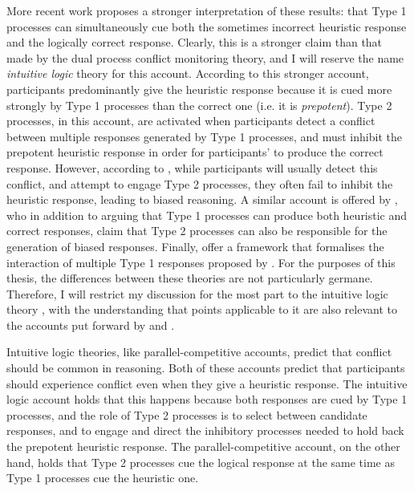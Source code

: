More recent work \citep[i.e.][]{DeNeys2012, DeNeys2014a}
proposes a stronger interpretation of these results:
that Type 1 processes can simultaneously cue
both the sometimes incorrect heuristic response
and the logically correct response.
Clearly, this is a stronger claim than that made by
the dual process conflict monitoring theory,
and I will reserve the name \emph{intuitive logic} theory for this account.
According to this stronger account,
participants predominantly give the heuristic response
because it is cued more strongly by Type 1 processes
than the correct one (i.e. it is \emph{prepotent}).
Type 2 processes, in this account, are activated when
participants detect a conflict between
multiple responses generated by Type 1 processes,
and must inhibit the prepotent heuristic response
in order for participants' to produce the correct response.
However, according to \citet{DeNeys2013},
while participants will usually detect this conflict,
and attempt to engage Type 2 processes,
they often fail to inhibit the heuristic response,
leading to biased reasoning.
A similar account is offered by \citet{Handley2015},
who in addition to arguing that Type 1 processes
can produce both heuristic and correct responses,
claim that Type 2 processes can also be responsible
for the generation of biased responses.
Finally, \citet{Pennycook2015} offer a framework
that formalises the interaction of multiple Type 1 responses
proposed by \citet{DeNeys2012,DeNeys2014a}.
For the purposes of this thesis,
the differences between these theories are not particularly germane.
Therefore, I will restrict my discussion for the most part
to the intuitive logic theory \citep{DeNeys2012,DeNeys2014a},
with the understanding that points applicable to it
are also relevant to the accounts put forward by \citet{Handley2015}
and \citet{Pennycook2015}.


Intuitive logic theories,
like parallel-competitive accounts,
predict that conflict should be common in reasoning.
Both of these  accounts predict that
participants should experience conflict
even when they give a heuristic response.
The intuitive logic account holds that this happens because
both responses are cued by Type 1 processes,
and the role of Type 2 processes is to
select between candidate responses,
and to engage and direct the inhibitory processes
needed to hold back the prepotent heuristic response.
The parallel-competitive account, on the other hand, holds that
Type 2 processes cue the logical response
at the same time as Type 1 processes cue the heuristic one.

